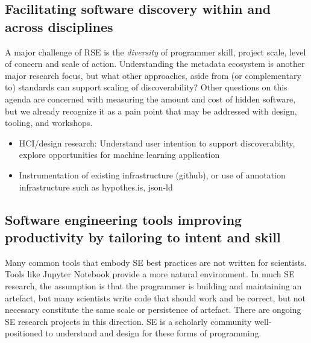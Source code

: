 \documentclass[a4paper,UKenglish]{dagman}
\begin{document}


\subsection{Facilitating software discovery within and across disciplines}


A major challenge of RSE is the \emph{diversity} of programmer skill, project scale, level of concern and scale of action. Understanding the metadata ecosystem is another major research focus, but what other approaches, aside from (or complementary to) standards can support scaling of discoverability? Other questions on this agenda are concerned with measuring the amount and cost of hidden software, but we already recognize it as a pain point that may be addressed with design, tooling, and workshops.


\begin{itemize}
\item HCI/design research: Understand user intention to support discoverability, explore opportunities for machine learning application
\item Instrumentation of existing infrastructure (github), or use of annotation infrastructure such as hypothes.is, json-ld
\end{itemize}

\subsection{Software engineering tools improving productivity by tailoring to intent and skill}

Many common tools that embody SE best practices are not written for scientists. Tools like Jupyter Notebook provide a more natural environment. In much SE research, the assumption is that the programmer is building and maintaining an artefact, but many scientists write code that should work and be correct, but not necessary constitute the same scale or persistence of artefact. There are ongoing SE research projects in this direction. SE is a scholarly community well-positioned to understand and design for these forms of programming.
\end{document}
